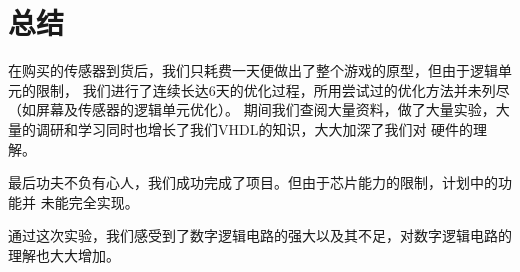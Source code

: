 \documentclass{article}
\begin{document}
\begin{spacing}{1.62}
\begin{itemize}
\begin{itemize}
		\end{itemize}

\end{itemize}

\section{总结}
\begin{spacing}{1.62}
	在购买的传感器到货后，我们只耗费一天便做出了整个游戏的原型，但由于逻辑单元的限制，
	我们进行了连续长达6天的优化过程，所用尝试过的优化方法并未列尽（如屏幕及传感器的逻辑单元优化）。
	期间我们查阅大量资料，做了大量实验，大量的调研和学习同时也增长了我们VHDL的知识，大大加深了我们对
	硬件的理解。
	
	最后功夫不负有心人，我们成功完成了项目。但由于芯片能力的限制，计划中的功能并
	未能完全实现。

	通过这次实验，我们感受到了数字逻辑电路的强大以及其不足，对数字逻辑电路的理解也大大增加。

\end{spacing}

\end{spacing}

\end{document}
